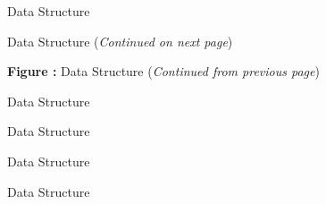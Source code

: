 \clearpage
\begin{figure}[!htp]
\centering

\caption{ Data Structure}
\label{f:Area}
\end{figure}


\clearpage
\begin{figure}[!htp]
\centering
\resizebox{\linewidth}{!}{}
\caption[ Data Structure]{ Data Structure (\textit{Continued on next page})}
\label{f:FlowEquationSet}
\end{figure}
\clearpage
\begin{figure}[!htp]
\centering
\resizebox{\linewidth}{!}{}
\par\vspace{\abovecaptionskip}
\textbf{Figure :}  Data Structure (\textit{Continued from previous page})
\end{figure}

\clearpage
\begin{figure}[!htp]
\centering

\caption{ Data Structure}
\label{f:GoverningEquations}
\end{figure}

\clearpage
\begin{figure}[!htp]
\centering

\caption{ Data Structure}
\label{f:GasModel}
\end{figure}

\clearpage
\begin{figure}[!htp]
\centering

\caption{ Data Structure}
\label{f:ViscosityModel}
\end{figure}

\clearpage
\begin{figure}[!htp]
\centering

\caption{ Data Structure}
\label{f:ThermalConductivityModel}
\end{figure}

